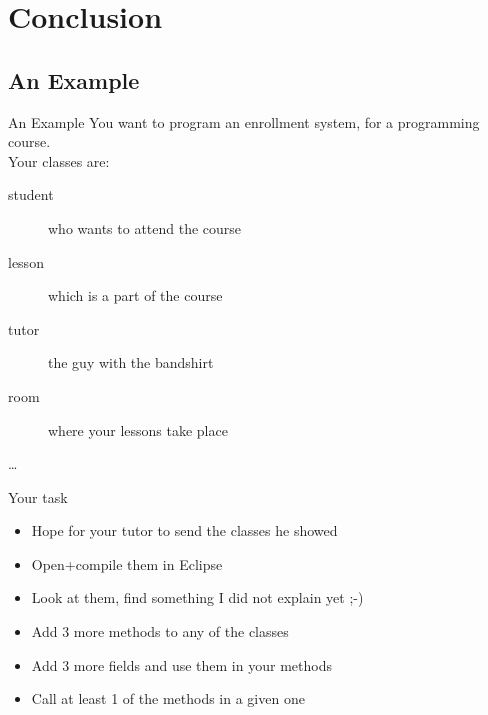 \section{Conclusion}
\subsection{An Example}

\begin{frame}{An Example}
	You want to program an enrollment system, for a programming course. \\
	\vspace{1em}
	Your classes are:\\
	\begin{description}
		\item[student] who wants to attend the course
		\item[lesson] which is a part of the course
		\item[tutor] the guy with the bandshirt
		\item[room] where your lessons take place
		\item[\dots]
	\end{description}
\end{frame}

\begin{frame}{Your task}

\begin{itemize}
	\item Hope for your tutor to send the classes he showed
	\item Open+compile them in Eclipse
	\item Look at them, find something I did not explain yet ;-)
	\item Add 3 more methods to any of the classes
	\item Add 3 more fields and use them in your methods
	\item Call at least 1 of the methods in a given one
\end{itemize}

\end{frame}



